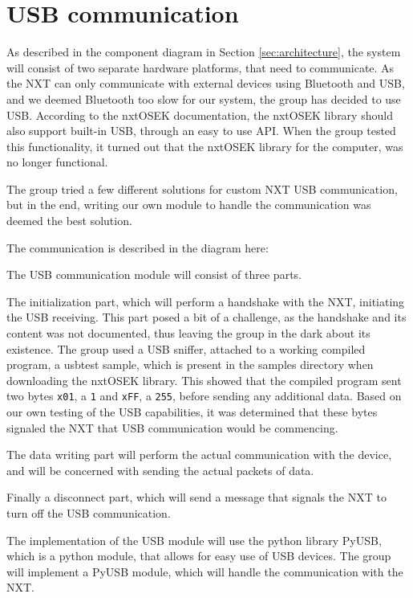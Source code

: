 \section{USB communication}
\label{sec:usb}
As described in the component diagram in Section \ref{sec:architecture}, the system will consist of two separate hardware platforms, that need to communicate.
As the NXT can only communicate with external devices using Bluetooth and USB, and we deemed Bluetooth too slow for our system, the group has decided to use USB.
According to the nxtOSEK documentation, the nxtOSEK library should also support built-in USB, through an easy to use API\cite{ecrobotUSB}.
When the group tested this functionality, it turned out that the nxtOSEK library for the computer, was no longer functional.

The group tried a few different solutions for custom NXT USB communication, but in the end, writing our own module to handle the communication was deemed the best solution.

The communication is described in the diagram here:


The USB communication module will consist of three parts.

The initialization part, which will perform a handshake with the NXT, initiating the USB receiving.
This part posed a bit of a challenge, as the handshake and its content was not documented, thus leaving the group in the dark about its existence.
The group used a USB sniffer, attached to a working compiled program, a usbtest sample, which is present in the samples directory when downloading the nxtOSEK library\cite{ecrobotUSB}.
This showed that the compiled program sent two bytes \texttt{x01}, a \texttt{1} and \texttt{xFF}, a \texttt{255}, before sending any additional data.
Based on our own testing of the USB capabilities, it was determined that these bytes signaled the NXT that USB communication would be commencing.

The data writing part will perform the actual communication with the device, and will be concerned with sending the actual packets of data.

Finally a disconnect part, which will send a message that signals the NXT to turn off the USB communication.



The implementation of the USB module will use the python library PyUSB, which is a python module, that allows for easy use of USB devices\cite{PyUSB}.
The group will implement a PyUSB module, which will handle the communication with the NXT.



